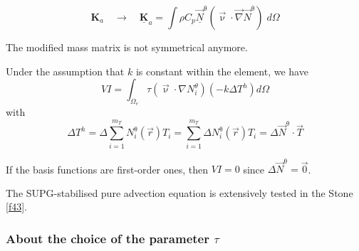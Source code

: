\[
{\bm K}_a \quad \rightarrow  \quad \underline{\bm K}_a 
= \int \rho C_p \vec{\underline{N}}^\uptheta ({\vec \upnu}\cdot \vec\nabla \vec{N}^\uptheta) \; d\Omega
\]

\begin{remark} 
The modified mass matrix is not symmetrical anymore.
\end{remark} 

Under the assumption that $k$ is constant within the element, we have 
\[
VI = \int_{\Omega_e} \tau(\vec\upnu\cdot\nabla N_i^\theta)(- k \Delta T^h ) d\Omega 
\]
with 
\[
\Delta T^h 
= \Delta \sum_{i=1}^{m_T} N^\uptheta_i ({\vec r}) T_i 
=  \sum_{i=1}^{m_T} \Delta N^\uptheta_i ({\vec r}) T_i = \Delta \vec N^\uptheta \cdot \vec T
\]

\begin{remark}
If the basis functions are first-order ones, then $VI=0$ since $\Delta \vec N^\uptheta = \vec 0$.  
\end{remark}

The SUPG-stabilised pure advection equation is extensively tested in the Stone \ref{f43}.


\subsubsection{About the choice of the parameter $\tau$}\label{ss:tausupg}

